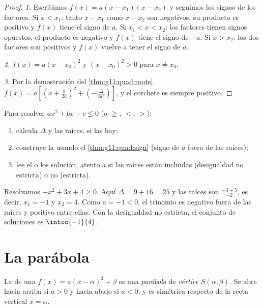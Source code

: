 \begin{proof}
\emph{1.} Escribimos $f(x) = a(x-x_1)(x-x_2)$ y seguimos los signos de los
factores. Si $x < x_1$: tanto $x - x_1$ como $x - x_2$ son negativos, su
producto es positivo y $f(x)$ tiene el signo de $a$. Si $x_1 < x < x_2$:
los factores tienen signos opuestos, el producto es negativo y $f(x)$
tiene el signo de $-a$. Si $x > x_2$: los dos factores son positivos y
$f(x)$ vuelve a tener el signo de $a$.

\emph{2.} $f(x) = a(x - x_0)^2$ y $(x-x_0)^2 > 0$ para $x \neq x_0$.

\emph{3.} Por la demostración del \cref{thm:g11:quad:roots},
$f(x) = a\left[\left(x + \frac{b}{2a}\right)^2 +
\left(-\frac{\Delta}{4a^2}\right)\right]$, y el corchete es siempre
positivo.
\end{proof}

\begin{method}\label{met:g11:quad:inequalities}
Para resolver $ax^2 + bx + c \leq 0$ (o $\geq$, $<$, $>$):
\begin{enumerate}
  \item calcula $\Delta$ y las raíces, si las hay;
  \item construye la  usando el \cref{thm:g11:quad:sign}
        (signo de $a$ fuera de las raíces);
  \item lee el  o los  solución, atento a si las raíces
        están incluidas (desigualdad no estricta) o no (estricta).
\end{enumerate}
\end{method}

\begin{example}\label{ex:g11:quad:inequality}
Resolvamos $-x^2 + 3x + 4 \geq 0$. Aquí $\Delta = 9 + 16 = 25$ y las
raíces son $\frac{-3 \pm 5}{-2}$, es decir, $x_1 = -1$ y $x_2 = 4$. Como
$a = -1 < 0$, el trinomio es negativo fuera de las raíces y positivo entre
ellas. Con la desigualdad no estricta, el conjunto de soluciones es
$\intcc{-1}{4}$.
\end{example}

\section{La parábola}

\begin{definition}[Parábola]\label{def:g11:quad:parabola}
La  de una  $f(x) = a(x-\alpha)^2+\beta$ es
una \emph{parábola} de \emph{vértice} $S(\alpha, \beta)$.
Se abre hacia arriba si $a > 0$ y hacia abajo si $a < 0$, y es simétrica
respecto de la recta vertical $x = \alpha$.
\end{definition}

